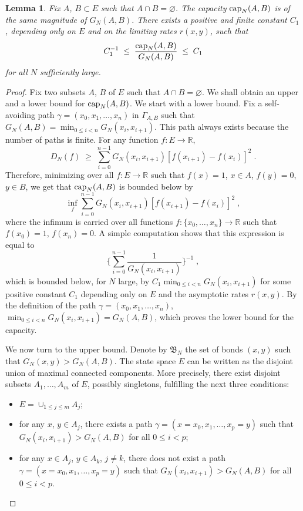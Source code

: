 \documentclass[reqno]{amsart}
\newtheorem{lemma}[theorem]{Lemma}
\begin{document}
\begin{lemma}
\label{s03}
Fix $A$, $B\subset E$ such that $A\cap B = \varnothing$. The capacity
${{\rm cap}}_N(A,B)$ is of the same magnitude of $G_N(A,B)$. There exists a
positive and finite constant $C_1$, depending only on $E$ and on the
limiting rates $r(x,y)$, such that
\begin{equation*}
  C_1^{-1} \;\le\; \frac{{{\rm cap}}_N(A,B)}{G_N(A,B)} \;\le\; C_1
\end{equation*}
for all $N$ sufficiently large.
\end{lemma}

\begin{proof}
Fix two subsets $A$, $B$ of $E$ such that $A\cap B = \varnothing$. We
shall obtain an upper and a lower bound for ${{\rm cap}}_N(A,B)$. We start
with a lower bound. Fix a self-avoiding path $\gamma= (x_0, x_1,
\dots, x_n)$ in $\Gamma_{A,B}$ such that $G_N(A,B) = \min_{0\le i <n}
G_N(x_i,x_{i+1})$. This path always exists because the number of paths
is finite. For any function $f:E\to {{\mathbb R}}$,
\begin{equation*}
D_N(f) \;\ge\; \sum_{i=0}^{n-1} G_N(x_i,x_{i+1}) [f(x_{i+1})-f(x_i)]^2
\; .
\end{equation*}
Therefore, minimizing over all $f:E\to {{\mathbb R}}$ such that $f(x)=1$,
$x\in A$, $f(y)=0$, $y\in B$, we get that ${{\rm cap}}_N(A,B)$ is bounded
below by
\begin{equation*}
\inf_f  \sum_{i=0}^{n-1} G_N(x_i,x_{i+1}) [f(x_{i+1})-f(x_i)]^2\;,
\end{equation*}
where the infimum is carried over all functions $f:\{x_0, \dots, x_n\}
\to {{\mathbb R}}$ such that $f(x_0)=1$, $f(x_n)=0$. A simple computation
shows that this expression is equal to
\begin{equation*}
\Big\{ \sum_{i=0}^{n-1} \frac 1{G_N(x_i,x_{i+1})} \Big\}^{-1} \;,
\end{equation*}
which is bounded below, for $N$ large, by $C_1 \min_{0\le i <n}
G_N(x_i,x_{i+1})$ for some positive constant $C_1$ depending only on
$E$ and the asymptotic rates $r(x,y)$. By the definition of the path
$\gamma= (x_0, x_1, \dots, x_n)$, $\min_{0\le i <n} G_N(x_i,x_{i+1}) =
G_N(A,B)$, which proves the lower bound for the capacity.

We now turn to the upper bound. Denote by ${{\mathfrak B}}_N$ the set of bonds
$(x,y)$ such that $G_N(x,y) > G_N(A,B)$. The state space $E$ can be
written as the disjoint union of maximal connected components. More
precisely, there exist disjoint subsets $A_1, \dots, A_m$ of $E$,
possibly singletons, fulfilling the next three conditions:
\begin{itemize}
\item $E = \cup_{1\le j\le m} A_j$;
\item for any $x$, $y \in A_j$, there exists a path $\gamma = (x=x_0,
  x_1, \dots, x_p=y)$ such that $G_N(x_i,x_{i+1}) > G_N(A,B)$ for
  all $0\le i <p$;
\item for any $x\in A_j$, $y\in A_k$, $j\not = k$, there does not
  exist a path $\gamma = (x=x_0, x_1, \dots, x_p=y)$ such that
  $G_N(x_i,x_{i+1}) > G_N(A,B)$ for all $0\le i <p$.
\end{itemize}


\end{proof}
\end{document}

